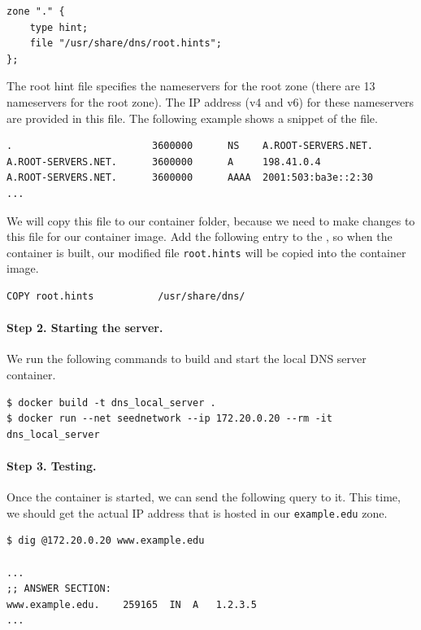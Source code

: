 \begin{lstlisting}
zone "." {
	type hint;
	file "/usr/share/dns/root.hints";
};
\end{lstlisting}
 
The root hint file specifies the nameservers for the 
root zone (there are 13 nameservers for the root zone). The 
IP address (v4 and v6) for these nameservers are provided in this file. 
The following example shows a snippet of the file. 


\begin{lstlisting}
.                        3600000      NS    A.ROOT-SERVERS.NET.
A.ROOT-SERVERS.NET.      3600000      A     198.41.0.4
A.ROOT-SERVERS.NET.      3600000      AAAA  2001:503:ba3e::2:30
...
\end{lstlisting}


We will copy this file to our container folder, because we need to make changes
to this file for our container image. Add the 
following entry to the \dockerfile, so when the container is built, our 
modified file \texttt{root.hints} will be copied into the container
image. 


\begin{lstlisting}
COPY root.hints           /usr/share/dns/
\end{lstlisting}
 


\paragraph{Step 2. Starting the server.} We run the following commands
to build and start the local DNS server container.

\begin{lstlisting}
$ docker build -t dns_local_server .
$ docker run --net seednetwork --ip 172.20.0.20 --rm -it dns_local_server
\end{lstlisting}
 

\paragraph{Step 3. Testing.} Once the container is started, we can
send the following query to it. This time, we should get the actual IP address 
that is hosted in our \texttt{example.edu} zone. 

\begin{lstlisting}
$ dig @172.20.0.20 www.example.edu

...
;; ANSWER SECTION:
www.example.edu.	259165	IN	A	1.2.3.5
...
\end{lstlisting}



